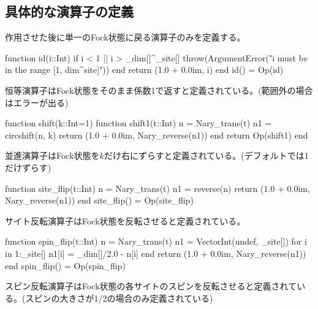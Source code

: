 \documentclass{ltjsarticle}
\begin{document}
\subsection*{具体的な演算子の定義}
作用させた後に単一のFock状態に戻る演算子のみを定義する。\\
\begin{jllisting}
function id(i::Int)
  if i < 1 || i > _dim[]^_site[]
    throw(ArgumentError("i must be in the range [1, dim^site]"))
  end
  return (1.0 + 0.0im, i)
end
id() = Op(id)
\end{jllisting}
恒等演算子はFock状態をそのまま係数1で返すと定義されている。(範囲外の場合はエラーが出る)
\begin{jllisting}
function shift(k::Int=1)
  function shift1(t::Int)
    n = Nary_trans(t)
    n1 = circshift(n, k)
    return (1.0 + 0.0im, Nary_reverse(n1))
  end
  return Op(shift1)
end
\end{jllisting}
並進演算子はFock状態を$k$だけ右にずらすと定義されている。(デフォルトでは1だけずらす)\\
\begin{jllisting}
function site_flip(t::Int)
  n = Nary_trans(t)
  n1 = reverse(n)
  return (1.0 + 0.0im, Nary_reverse(n1))
end
site_flip() = Op(site_flip)
\end{jllisting}
サイト反転演算子はFock状態を反転させると定義されている。\\
\begin{jllisting}
function spin_flip(t::Int)
  n = Nary_trans(t)
  n1 = Vector{Int}(undef, _site[])
  for i in 1:_site[]
    n1[i] = _dim[]/2.0 - n[i]
  end
  return (1.0 + 0.0im, Nary_reverse(n1))
end
spin_flip() = Op(spin_flip)
\end{jllisting}
スピン反転演算子はFock状態の各サイトのスピンを反転させると定義されている。(スピンの大きさが1/2の場合のみ定義されている)\\
\end{document}
